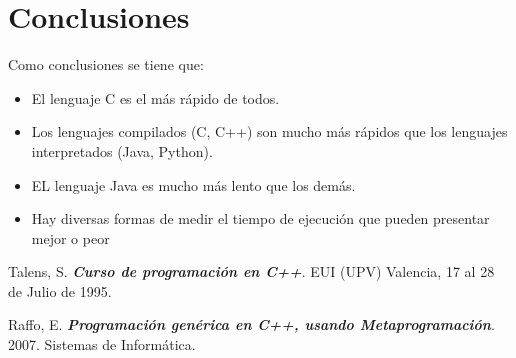 \section{Conclusiones}

Como conclusiones se tiene que:
\begin{itemize}
\item El lenguaje C es el más rápido de todos.
\item Los lenguajes compilados (C, C++) son mucho más rápidos que los lenguajes interpretados (Java, Python).
\item EL lenguaje Java es mucho más lento que los demás.
\item Hay diversas formas de medir el tiempo de ejecución que pueden presentar mejor o peor 
\end{itemize}


\begin{thebibliography}{IEEE}
 Talens, S. \textbf{\textit{Curso de programación en C++}}. EUI (UPV) Valencia, 17 al 28 de Julio de 1995. 

 Raffo, E. \textbf{\textit{Programación genérica en C++, usando Metaprogramación}}. 2007. Sistemas de Informática. 
\end{thebibliography}

